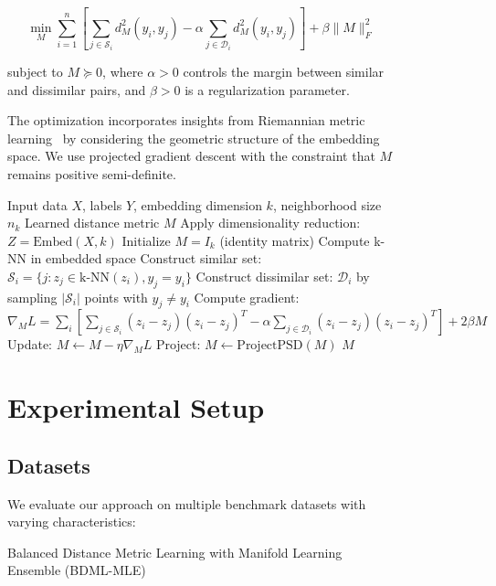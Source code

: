 \documentclass[review]{elsarticle}
\begin{document}
\begin{figure}[htbp]
\begin{equation}
\min_M \sum_{i=1}^n \left[ \sum_{j \in \mathcal{S}_i} d_M^2(y_i, y_j) - \alpha \sum_{j \in \mathcal{D}_i} d_M^2(y_i, y_j) \right] + \beta \|M\|_F^2
\end{equation}

subject to $M \succeq 0$, where $\alpha > 0$ controls the margin between similar and dissimilar pairs, and $\beta > 0$ is a regularization parameter.

The optimization incorporates insights from Riemannian metric learning~\cite{gruffaz2025riemannian} by considering the geometric structure of the embedding space. We use projected gradient descent with the constraint that $M$ remains positive semi-definite.

\begin{algorithm}
\caption{Balanced Distance Metric Learning with Manifold Learning Ensemble (BDML-MLE)}
\begin{algorithmic}[1]
\REQUIRE Input data $X$, labels $Y$, embedding dimension $k$, neighborhood size $n_k$
\ENSURE Learned distance metric $M$
\STATE Apply dimensionality reduction: $Z = \text{Embed}(X, k)$
\STATE Initialize $M = I_k$ (identity matrix)
    \STATE Compute k-NN in embedded space
    \STATE Construct similar set: $\mathcal{S}_i = \{j : z_j \in \text{k-NN}(z_i), y_j = y_i\}$
    \STATE Construct dissimilar set: $\mathcal{D}_i$ by sampling $|\mathcal{S}_i|$ points with $y_j \neq y_i$
\ENDFOR
{}
    \STATE Compute gradient: $\nabla_M L = \sum_i \left[\sum_{j \in \mathcal{S}_i} (z_i - z_j)(z_i - z_j)^T - \alpha \sum_{j \in \mathcal{D}_i} (z_i - z_j)(z_i - z_j)^T\right] + 2\beta M$
    \STATE Update: $M \leftarrow M - \eta \nabla_M L$
    \STATE Project: $M \leftarrow \text{ProjectPSD}(M)$
\ENDWHILE
\RETURN $M$
\end{algorithmic}
\end{algorithm}

\section{Experimental Setup}
\label{sec:experiments}

\subsection{Datasets}

We evaluate our approach on multiple benchmark datasets with varying characteristics:


\end{figure}
\end{document}
